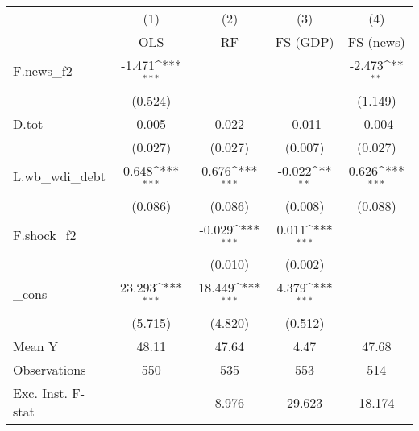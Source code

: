 {
\def\sym#1{\ifmmode^{#1}\else\(^{#1}\)\fi}
\begin{tabular}{l*{4}{c}}
\toprule
            &\multicolumn{1}{c}{(1)}&\multicolumn{1}{c}{(2)}&\multicolumn{1}{c}{(3)}&\multicolumn{1}{c}{(4)}\\
            &\multicolumn{1}{c}{OLS}&\multicolumn{1}{c}{RF}&\multicolumn{1}{c}{FS (GDP)}&\multicolumn{1}{c}{FS (news)}\\
\midrule
F.news\_f2   &      -1.471\sym{***}&                     &                     &      -2.473\sym{**} \\
            &     (0.524)         &                     &                     &     (1.149)         \\
\addlinespace
D.tot       &       0.005         &       0.022         &      -0.011         &      -0.004         \\
            &     (0.027)         &     (0.027)         &     (0.007)         &     (0.027)         \\
\addlinespace
L.wb\_wdi\_debt&       0.648\sym{***}&       0.676\sym{***}&      -0.022\sym{**} &       0.626\sym{***}\\
            &     (0.086)         &     (0.086)         &     (0.008)         &     (0.088)         \\
\addlinespace
F.shock\_f2  &                     &      -0.029\sym{***}&       0.011\sym{***}&                     \\
            &                     &     (0.010)         &     (0.002)         &                     \\
\addlinespace
\_cons      &      23.293\sym{***}&      18.449\sym{***}&       4.379\sym{***}&                     \\
            &     (5.715)         &     (4.820)         &     (0.512)         &                     \\
\midrule
Mean Y      &       48.11         &       47.64         &        4.47         &       47.68         \\
Observations&         550         &         535         &         553         &         514         \\
Exc. Inst. F-stat&                     &       8.976         &      29.623         &      18.174         \\
\bottomrule
\end{tabular}
}
